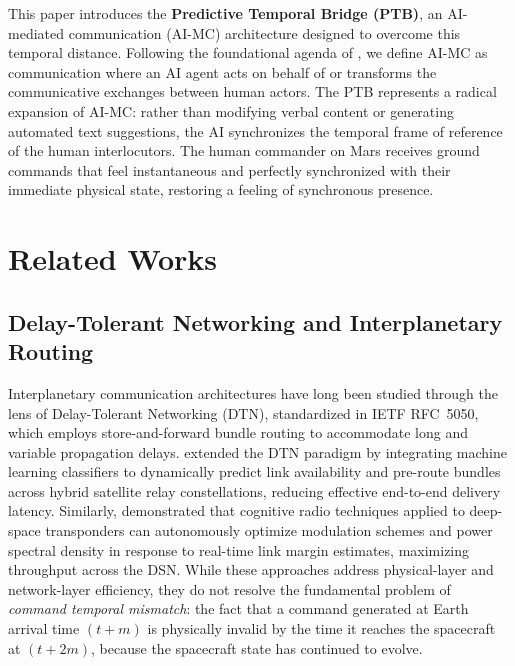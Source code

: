 \documentclass[ASNA,twocolumn]{USG}
\begin{document}
This paper introduces the \textbf{Predictive Temporal Bridge (PTB)}, an
AI-mediated communication (AI-MC) architecture designed to overcome this temporal distance.
Following the foundational agenda of \cite{hancock2020}, we define AI-MC as communication
where an AI agent acts on behalf of or transforms the communicative exchanges between human actors.
The PTB represents a radical expansion of AI-MC: rather than modifying verbal content or
generating automated text suggestions, the AI synchronizes the temporal frame of reference
of the human interlocutors. The human commander on Mars receives ground commands that feel
instantaneous and perfectly synchronized with their immediate physical state, restoring
a feeling of synchronous presence.

\section{Related Works}

\subsection{Delay-Tolerant Networking and Interplanetary Routing}
Interplanetary communication architectures have long been studied through the lens of
Delay-Tolerant Networking (DTN), standardized in IETF RFC~5050, which employs
store-and-forward bundle routing to accommodate long and variable propagation delays.
\cite{jsiar2024} extended the DTN paradigm by integrating machine learning classifiers
to dynamically predict link availability and pre-route bundles across hybrid satellite
relay constellations, reducing effective end-to-end delivery latency. Similarly,
\cite{nasa_cognitive2023} demonstrated that cognitive radio techniques applied to deep-space
transponders can autonomously optimize modulation schemes and power spectral density in
response to real-time link margin estimates, maximizing throughput across the DSN.
While these approaches address physical-layer and network-layer efficiency, they do not
resolve the fundamental problem of \textit{command temporal mismatch}: the fact that a
command generated at Earth arrival time \((t+m)\) is physically invalid by the time it
reaches the spacecraft at \((t+2m)\), because the spacecraft state has continued to evolve.
\end{document}

